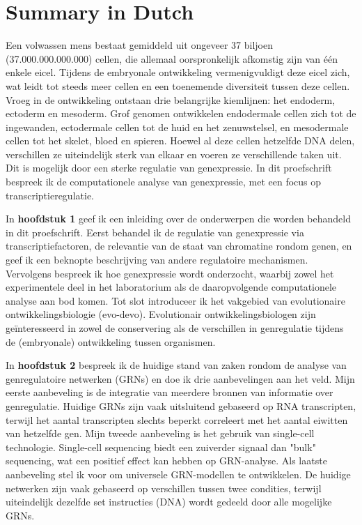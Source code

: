 \section{Summary in Dutch}

Een volwassen mens bestaat gemiddeld uit ongeveer 37 biljoen (37.000.000.000.000) cellen, die allemaal oorspronkelijk afkomstig zijn van \'e\'en enkele eicel. Tijdens de embryonale ontwikkeling vermenigvuldigt deze eicel zich, wat leidt tot steeds meer cellen en een toenemende diversiteit tussen deze cellen. Vroeg in de ontwikkeling ontstaan drie belangrijke kiemlijnen: het endoderm, ectoderm en mesoderm. Grof genomen ontwikkelen endodermale cellen zich tot de ingewanden, ectodermale cellen tot de huid en het zenuwstelsel, en mesodermale cellen tot het skelet, bloed en spieren. Hoewel al deze cellen hetzelfde DNA delen, verschillen ze uiteindelijk sterk van elkaar en voeren ze verschillende taken uit. Dit is mogelijk door een sterke regulatie van genexpressie. In dit proefschrift bespreek ik de computationele analyse van genexpressie, met een focus op transcriptieregulatie.

In \textbf{hoofdstuk 1} geef ik een inleiding over de onderwerpen die worden behandeld in dit proefschrift. Eerst behandel ik de regulatie van genexpressie via transcriptiefactoren, de relevantie van de staat van chromatine rondom genen, en geef ik een beknopte beschrijving van andere regulatoire mechanismen. Vervolgens bespreek ik hoe genexpressie wordt onderzocht, waarbij zowel het experimentele deel in het laboratorium als de daaropvolgende computationele analyse aan bod komen. Tot slot introduceer ik het vakgebied van evolutionaire ontwikkelingsbiologie (evo-devo). Evolutionair ontwikkelingsbiologen zijn geïnteresseerd in zowel de conservering als de verschillen in genregulatie tijdens de (embryonale) ontwikkeling tussen organismen.

In \textbf{hoofdstuk 2} bespreek ik de huidige stand van zaken rondom de analyse van genregulatoire netwerken (GRNs) en doe ik drie aanbevelingen aan het veld. Mijn eerste aanbeveling is de integratie van meerdere bronnen van informatie over genregulatie. Huidige GRNs zijn vaak uitsluitend gebaseerd op RNA transcripten, terwijl het aantal transcripten slechts beperkt correleert met het aantal eiwitten van hetzelfde gen. Mijn tweede aanbeveling is het gebruik van single-cell technologie. Single-cell sequencing biedt een zuiverder signaal dan "bulk" sequencing, wat een positief effect kan hebben op GRN-analyse. Als laatste aanbeveling stel ik voor om universele GRN-modellen te ontwikkelen. De huidige netwerken zijn vaak gebaseerd op verschillen tussen twee condities, terwijl uiteindelijk dezelfde set instructies (DNA) wordt gedeeld door alle mogelijke GRNs.

